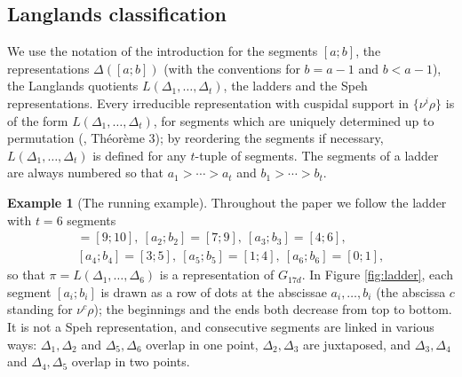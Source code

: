 \documentclass[a4paper,12pt,leqno]{amsart}
\theoremstyle{plain}
\theoremstyle{definition}
\theoremstyle{definition}
\newtheorem{example}[thm]{Example}
\begin{document}
\subsection{Langlands classification}
We use the notation of the introduction for the segments $[a;b]$, the representations
$\Delta([a;b])$ (with the conventions for $b=a-1$ and $b<a-1$), the Langlands quotients
$L(\Delta_1,\ldots,\Delta_t)$, the ladders and the Speh representations. Every irreducible representation with cuspidal support in $\{\nu^i\rho\}$ is of the form $L(\Delta_1,\ldots,\Delta_t)$, for
segments which are uniquely determined up to permutation (\cite{Rod82}, Th\'eor\`eme 3); by reordering
the segments if necessary, $L(\Delta_1,\ldots,\Delta_t)$ is defined for any $t$-tuple of segments. The
segments of a ladder are always numbered so that $a_1>\cdots>a_t$ and $b_1>\cdots>b_t$.

\begin{example}[The running example]\label{ex:run} Throughout the paper we follow the ladder with
$t=6$ segments
\begin{gather*}[a_1;b_1]=[9;10],\ [a_2;b_2]=[7;9],\ [a_3;b_3]=[4;6],\\
[a_4;b_4]=[3;5],\ [a_5;b_5]=[1;4],\ [a_6;b_6]=[0;1],\end{gather*}
so that $\pi=L(\Delta_1,\ldots,\Delta_6)$ is a representation of $G_{17d}$. In Figure
\ref{fig:ladder}, each segment $[a_i;b_i]$ is drawn as a row of dots at the abscissae
$a_i,\ldots,b_i$ (the abscissa $c$ standing for $\nu^c\rho$); the beginnings and the ends both
decrease from top to bottom. It is not a Speh representation, and consecutive segments are linked in
various ways: $\Delta_1,\Delta_2$ and $\Delta_5,\Delta_6$ overlap in one point, $\Delta_2,\Delta_3$
are juxtaposed, and $\Delta_3,\Delta_4$ and $\Delta_4,\Delta_5$ overlap in two points.
\end{example}
\end{document}
